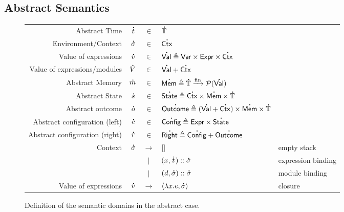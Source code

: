 \documentclass[acmsmall,screen,review]{acmart}\settopmatter{printfolios=true,printccs=false,printacmref=false}
\theoremstyle{acmdefinition}
\newcommand*{\vbar}{|}
\newcommand*{\cons}{::}
\newcommand*{\pset}{\mathcal{P}}
\newcommand*{\A}[1]{\overset{\,_{\mbox{\Large .}}}{#1}}
\newcommand*{\Expr}{\mathsf{Expr}}
\newcommand*{\ExprVar}{\mathsf{Var}}
\newcommand*{\modid}{d}
\newcommand*{\Time}{\mathbb{T}}
\newcommand*{\ctx}{\sigma}
\newcommand*{\Ctx}{\mathsf{Ctx}}
\newcommand*{\Value}{\mathsf{Val}}
\newcommand*{\Mem}{\mathsf{Mem}}
\newcommand*{\mem}{m}
\newcommand*{\Config}{\mathsf{Config}}
\newcommand*{\config}{c}
\newcommand*{\Right}{\mathsf{Right}}
\newcommand*{\rightst}{r}
\newcommand*{\State}{\mathsf{State}}
\newcommand*{\Outcome}{\mathsf{Outcome}}
\newcommand*{\fin}[2]{{#1}\xrightarrow{\text{fin}}{#2}}
\begin{document}
\subsection{Abstract Semantics}
\begin{figure}[h!]
  \footnotesize
  \centering
  \begin{tabular}{rrcll}
    Abstract Time                  & $\A{t}$        & $\in$         & $\A{\Time}$                                                                                      \\
    Environment/Context            & $\A{\ctx}$     & $\in$         & $\A{\Ctx}$                                                                                       \\
    Value of expressions           & $\A{v}$        & $\in$         & $\A{\Value} \triangleq \ExprVar\times\Expr\times\A{\Ctx}$                                        \\
    Value of expressions/modules   & $\A{V}$        & $\in$         & $\A{\Value}+\A{\Ctx}$                                                                            \\
    Abstract Memory                & $\A{\mem}$     & $\in$         & $\A{\Mem} \triangleq \fin{\A{\Time}}{\pset(\A{\Value})}$                                         \\
    Abstract State                 & $\A{s}$        & $\in$         & $\A{\State} \triangleq \A{\Ctx}\times\A{\Mem}\times\A{\Time}$                                    \\
    Abstract outcome               & $\A{o}$        & $\in$         & $\A{\Outcome} \triangleq(\A{\Value}+\A{\Ctx})\times\A{\Mem}\times\A{\Time}$                      \\
    Abstract configuration (left)  & $\A{\config}$  & $\in$         & $\A{\Config}\triangleq\Expr\times\A{\State}$                                                     \\
    Abstract configuration (right) & $\A{\rightst}$ & $\in$         & $\A{\Right}\triangleq\A{\Config}+\A{\Outcome}$                                                   \\
    Context                        & $\A{\ctx}$     & $\rightarrow$ & []                                                                          & empty stack        \\
                                   &                & $\vbar$       & $(x,\A{t})\cons \A{\ctx}$                                                   & expression binding \\
                                   &                & $\vbar$       & $(\modid,\A{\ctx})\cons \A{\ctx}$                                           & module binding     \\
    Value of expressions           & $\A{v}$        & $\rightarrow$ & $\langle \lambda x.e, \A{\ctx} \rangle$                                     & closure
  \end{tabular}
  \caption{Definition of the semantic domains in the abstract case.}
  \label{fig:absdom}
\end{figure}
\end{document}
